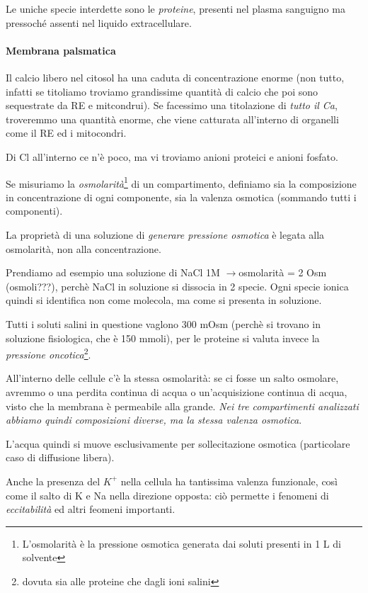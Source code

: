 \documentclass[a4paper,12pt]{article}
\newcommand{\lfreccia}{\ensuremath{\longrightarrow}}
\begin{document}
Le uniche specie interdette sono le \emph{proteine}, presenti nel plasma sanguigno ma pressoché assenti nel liquido extracellulare.

\paragraph{Membrana palsmatica}

Il calcio libero nel citosol ha una caduta di concentrazione enorme (non tutto, infatti se titoliamo troviamo grandissime quantità di calcio che poi sono sequestrate da RE e mitcondrui). Se facessimo una titolazione di \emph{tutto il Ca}, troveremmo una quantità enorme, che viene catturata all'interno di organelli come il RE ed i mitocondri. 

Di Cl all'interno ce n'è poco, ma vi troviamo anioni proteici e anioni fosfato.

Se misuriamo la \emph{osmolarità}\footnote{L'osmolarità è la pressione osmotica generata dai soluti presenti in 1 L di solvente} di un compartimento, definiamo sia la composizione in concentrazione di ogni componente, sia la valenza osmotica (sommando tutti i componenti).

La proprietà di una soluzione di \emph{generare pressione osmotica} è legata alla osmolarità, non alla concentrazione.

Prendiamo ad esempio una soluzione di NaCl 1M \lfreccia  osmolarità = 2 Osm (osmoli???), perchè NaCl in soluzione si dissocia in 2 specie. Ogni specie ionica quindi si identifica non come molecola, ma come si presenta in soluzione.

Tutti i soluti salini in questione vaglono 300 mOsm (perchè si trovano in soluzione fisiologica, che è 150 mmoli), per le proteine si valuta invece la \emph{pressione oncotica}\footnote{dovuta sia alle proteine che dagli ioni salini}.

All'interno delle cellule c'è la stessa osmolarità: se ci fosse un salto osmolare, avremmo o una perdita continua di acqua o un'acquisizione continua di acqua, visto che la membrana è permeabile alla grande. \emph{Nei tre compartimenti analizzati abbiamo quindi composizioni diverse, ma la stessa valenza osmotica}.

L'acqua quindi si muove esclusivamente per sollecitazione osmotica (particolare caso di diffusione libera).

Anche la presenza del $K^{+}$ nella cellula ha tantissima valenza funzionale, così come il salto di K e Na nella direzione opposta: ciò permette i fenomeni di \emph{eccitabilità} ed altri feomeni importanti.
\end{document}
